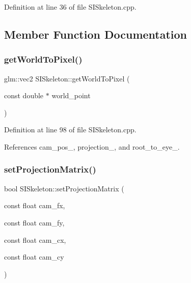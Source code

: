 Definition at line 36 of file S\+I\+Skeleton.\+cpp.



\subsection{Member Function Documentation}
\mbox{\label{classSISkeleton_adbd224633ac2e4c0285cf2cf760cc42a}} 
\subsubsection{\texorpdfstring{get\+World\+To\+Pixel()}{getWorldToPixel()}}
{\footnotesize\ttfamily glm\+::vec2 S\+I\+Skeleton\+::get\+World\+To\+Pixel (\begin{DoxyParamCaption}\item[{const double $\ast$}]{world\+\_\+point }\end{DoxyParamCaption})\hspace{0.3cm}{\ttfamily [protected]}}



Definition at line 98 of file S\+I\+Skeleton.\+cpp.



References cam\+\_\+pos\+\_\+, projection\+\_\+, and root\+\_\+to\+\_\+eye\+\_\+.

\mbox{\label{classSISkeleton_aa1f5e1a67363038821a5d514fb361a38}} 
\subsubsection{\texorpdfstring{set\+Projection\+Matrix()}{setProjectionMatrix()}}
{\footnotesize\ttfamily bool S\+I\+Skeleton\+::set\+Projection\+Matrix (\begin{DoxyParamCaption}\item[{const float}]{cam\+\_\+fx,  }\item[{const float}]{cam\+\_\+fy,  }\item[{const float}]{cam\+\_\+cx,  }\item[{const float}]{cam\+\_\+cy }\end{DoxyParamCaption})}



